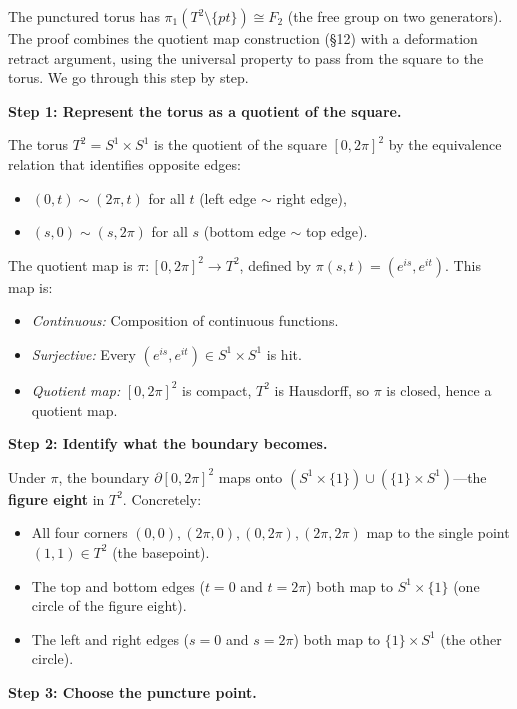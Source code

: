 \documentclass[11pt]{report}
\begin{document}
\begin{exbox}
The punctured torus has $\pi_1(T^2 \setminus \{pt\}) \cong F_2$ (the free group on two generators). The proof combines the quotient map construction (\S 12) with a deformation retract argument, using the universal property to pass from the square to the torus. We go through this step by step.

\textbf{Step 1: Represent the torus as a quotient of the square.}

The torus $T^2 = S^1 \times S^1$ is the quotient of the square $[0, 2\pi]^2$ by the equivalence relation that identifies opposite edges:
\begin{itemize}[nosep]
    \item $(0, t) \sim (2\pi, t)$ for all $t$ (left edge $\sim$ right edge),
    \item $(s, 0) \sim (s, 2\pi)$ for all $s$ (bottom edge $\sim$ top edge).
\end{itemize}
The quotient map is $\pi: [0, 2\pi]^2 \to T^2$, defined by $\pi(s, t) = (e^{is}, e^{it})$. This map is:
\begin{itemize}[nosep]
    \item \textit{Continuous:} Composition of continuous functions.
    \item \textit{Surjective:} Every $(e^{is}, e^{it}) \in S^1 \times S^1$ is hit.
    \item \textit{Quotient map:} $[0, 2\pi]^2$ is compact, $T^2$ is Hausdorff, so $\pi$ is closed, hence a quotient map.
\end{itemize}

\textbf{Step 2: Identify what the boundary becomes.}

Under $\pi$, the boundary $\partial[0, 2\pi]^2$ maps onto $(S^1 \times \{1\}) \cup (\{1\} \times S^1)$---the \textbf{figure eight} in $T^2$. Concretely:
\begin{itemize}[nosep]
    \item All four corners $(0,0), (2\pi, 0), (0, 2\pi), (2\pi, 2\pi)$ map to the single point $(1, 1) \in T^2$ (the basepoint).
    \item The top and bottom edges ($t = 0$ and $t = 2\pi$) both map to $S^1 \times \{1\}$ (one circle of the figure eight).
    \item The left and right edges ($s = 0$ and $s = 2\pi$) both map to $\{1\} \times S^1$ (the other circle).
\end{itemize}

\textbf{Step 3: Choose the puncture point.}


\end{exbox}
\end{document}

